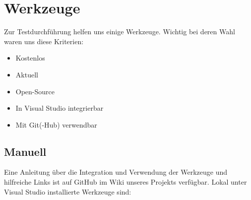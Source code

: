%



\section{Werkzeuge}
\label{Abschnitt:Tests:Werkzeuge}

Zur Testdurchführung helfen uns einige Werkzeuge. Wichtig bei deren Wahl waren uns diese Kriterien:

\begin{itemize}

	\item Kostenlos
	\item Aktuell
	\item Open-Source
	\item In Visual Studio integrierbar
	\item Mit Git(-Hub) verwendbar

\end{itemize}



\subsection{Manuell}
\label{Abschnitt:Programmfehler:Werkzeuge:Manuell}

Eine Anleitung über die Integration und Verwendung der Werkzeuge und hilfreiche Links ist auf GitHub im Wiki unseres Projekts verfügbar. Lokal unter Visual Studio installierte Werkzeuge sind:
\\
\\

